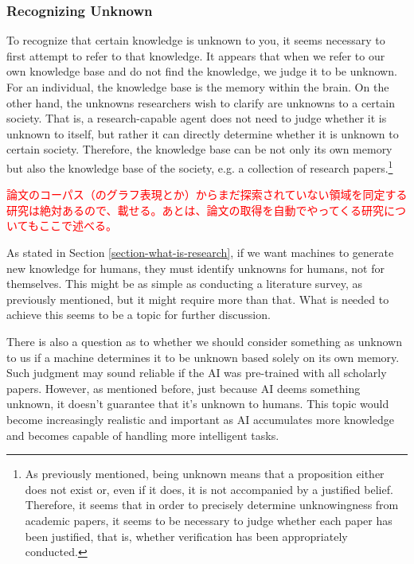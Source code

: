 \subsubsection{Recognizing Unknown}
To recognize that certain knowledge is unknown to you, it seems necessary to first attempt to refer to that knowledge. It appears that when we refer to our own knowledge base and do not find the knowledge, we judge it to be unknown. For an individual, the knowledge base is the memory within the brain. On the other hand, the unknowns researchers wish to clarify are unknowns to a certain society. That is, a research-capable agent does not need to judge whether it is unknown to itself, but rather it can directly determine whether it is unknown to certain society. Therefore, the knowledge base can be not only its own memory but also the knowledge base of the society, e.g. a collection of research papers.\footnote{
As previously mentioned, being unknown means that a proposition either does not exist or, even if it does, it is not accompanied by a justified belief. Therefore, it seems that in order to precisely determine unknowingness from academic papers, it seems to be necessary to judge whether each paper has been justified, that is, whether verification has been appropriately conducted. 
}

\textcolor{red}{論文のコーパス（のグラフ表現とか）からまだ探索されていない領域を同定する研究は絶対あるので、載せる。あとは、論文の取得を自動でやってくる研究についてもここで述べる。}

As stated in Section \ref{section-what-is-research}, if we want machines to generate new knowledge for humans, they must identify unknowns for humans, not for themselves. This might be as simple as conducting a literature survey, as previously mentioned, but it might require more than that. What is needed to achieve this seems to be a topic for further discussion.

There is also a question as to whether we should consider something as unknown to us if a machine determines it to be unknown based solely on its own memory. Such judgment may sound reliable if the AI was pre-trained with all scholarly papers. However, as mentioned before, just because AI deems something unknown, it doesn't guarantee that it's unknown to humans. This topic would become increasingly realistic and important as AI accumulates more knowledge and becomes capable of handling more intelligent tasks.


